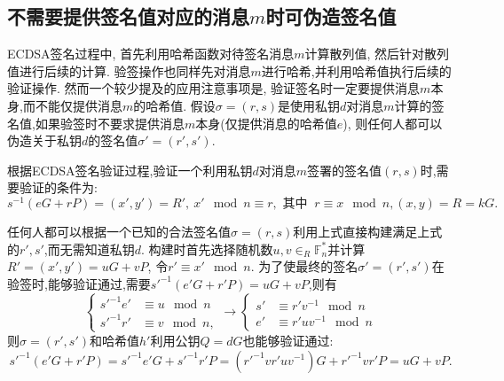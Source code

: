 \documentclass{article}
\newcommand{\F}{\mathbb{F}}
\begin{document}
\subsection{不需要提供签名值对应的消息$m$时可伪造签名值}

ECDSA签名过程中, 首先利用哈希函数对待签名消息$m$计算散列值, 然后针对散列值进行后续的计算.
验签操作也同样先对消息$m$进行哈希,并利用哈希值执行后续的验证操作.
然而一个较少提及的应用注意事项是, 验证签名时一定要提供消息$m$本身,而不能仅提供消息$m$的哈希值.
假设$\sigma=(r, s)$是使用私钥$d$对消息$m$计算的签名值,如果验签时不要求提供消息$m$本身(仅提供消息的哈希值$e$),
则任何人都可以伪造关于私钥$d$的签名值$\sigma'=(r', s')$.

根据ECDSA签名验证过程,验证一个利用私钥$d$对消息$m$签署的签名值$(r,s)$时,需要验证的条件为:
$$s^{-1}(eG+rP) = (x', y') = R', \  x' \mod n \equiv r, \text{ 其中 }\  r \equiv x \mod n, (x,y) = R = kG.$$

任何人都可以根据一个已知的合法签名值$\sigma=(r,s)$利用上式直接构建满足上式的$r', s'$,而无需知道私钥$d$.
构建时首先选择随机数$u, v\in_R\F_n^*$并计算$R' = (x', y') = uG + vP$, 令$r' \equiv x' \mod n$.
为了使最终的签名$\sigma' = (r', s')$在验签时,能够验证通过,需要$s'^{-1}(e'G  + r'P) = uG + vP$,则有
\begin{equation}\nonumber
\left\{
\begin{array}{ll}
s'^{-1}e' & \equiv u \mod n\\
s'^{-1}r' & \equiv v \mod n,
\end{array}
\right.
\rightarrow
\left\{
\begin{array}{ll}
s' & \equiv r'v^{-1} \mod n\\
e' & \equiv r'uv^{-1} \mod n
\end{array}
\right.
\end{equation}
则$\sigma = (r', s')$和哈希值$h'$利用公钥$Q=dG$也能够验证通过:
$$
s'^{-1}(e'G + r'P) = s'^{-1}e' G + s'^{-1}r'P = (r'^{-1}v r'uv^{-1})G + r'^{-1}vr' P  = uG + vP.
$$
\end{document}
